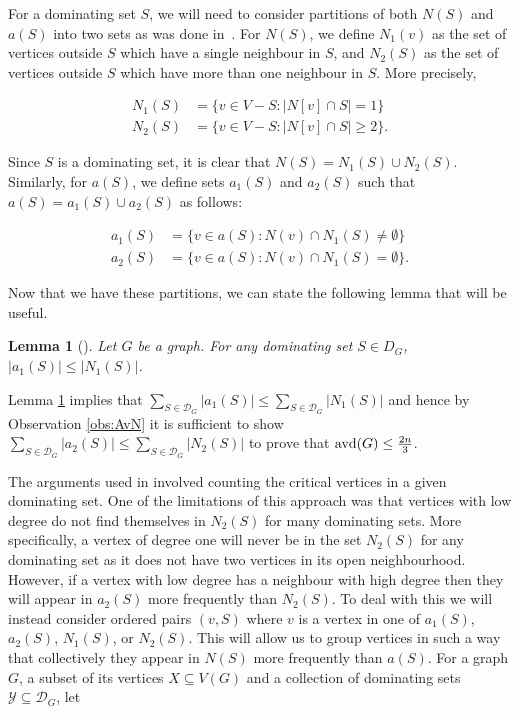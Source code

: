 \documentclass[11pt]{article}
\newtheorem{lemma}[definition]{Lemma}
\newcommand{\avd}{\text{\rm{avd}}}
\begin{document}
For a dominating set $S$, we will need to consider partitions of both $N(S)$ and $a(S)$ into two sets as was done in~\cite{2021Beaton}. For $N(S)$, we define $N_1(v)$ as the set of vertices outside $S$ which have a single neighbour in $S$, and $N_2(S)$ as the set of vertices outside $S$ which have more than one neighbour in $S$. More precisely,

\vspace{-6mm}

\begin{align*}
N_1(S) &= \{v \in V-S : |N[v] \cap S| = 1 \}\\
N_2(S) &= \{v \in V-S : |N[v] \cap S| \geq 2 \}.
\end{align*}

\noindent Since $S$ is a dominating set, it is clear that $N(S)=N_1(S)\cup N_2(S)$. Similarly, for $a(S)$, we define sets $a_1(S)$ and $a_2(S)$ such that $a(S) = a_1(S) \cup a_2(S)$ as follows:

\vspace{-6mm}

\begin{align*}
a_1(S) &= \{v \in a(S) : N(v) \cap N_1(S) \neq \emptyset \}\\
a_2(S) &= \{v \in a(S) : N(v) \cap N_1(S) = \emptyset \}.
\end{align*} 


Now that we have these partitions, we can state the following lemma that will be useful.

\begin{lemma}[\cite{2021Beaton}]
\label{lem:a1n1}
 Let $G$ be a graph. For any dominating set $S \in D_G$, $|a_1(S)| \leq |N_1(S)|$.
\end{lemma}

Lemma \ref{lem:a1n1} implies that $\sum\limits_{S \in \mathcal{D}_G}|a_1(S)| \leq \sum\limits_{S \in \mathcal{D}_G}|N_1(S)|$ and hence by Observation \ref{obs:AvN} it is sufficient to show $\sum\limits_{S \in \mathcal{D}_G}|a_2(S)| \leq \sum\limits_{S \in \mathcal{D}_G}|N_2(S)|$ to prove that $\avd(G) \leq \frac{2n}{3}$.

The arguments used in \cite{2021Beaton} involved counting the critical vertices in a given dominating set. One of the limitations of this approach was that vertices with low degree do not find themselves in $N_2(S)$ for many dominating sets. More specifically, a vertex of degree one will never be in the set $N_2(S)$ for any dominating set as it does not have two vertices in its open neighbourhood. However, if a vertex with low degree has a neighbour with high degree then they will appear in $a_2(S)$ more frequently than $N_2(S)$. To deal with this we will instead consider ordered pairs $(v, S)$ where $v$ is a vertex in one of $a_1(S)$, $a_2(S)$, $N_1(S)$, or $N_2(S)$. This will allow us to group vertices in such a way that collectively they appear in $N(S)$ more frequently than $a(S)$. For a graph $G$, a subset of its vertices $X \subseteq V(G)$ and a collection of dominating sets $\mathcal{Y} \subseteq \mathcal{D}_G$, let 
\end{document}
